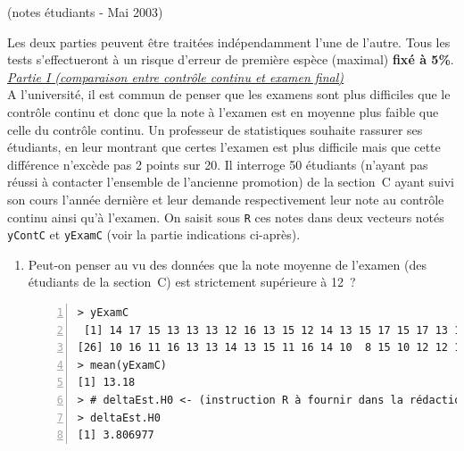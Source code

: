 \documentclass[10pt]{report}
\begin{document}
\begin{exercice} (notes étudiants - Mai 2003)

Les deux parties peuvent {\^e}tre trait{\'e}es ind{\'e}pendamment l'une de l'autre. Tous les tests s'effectueront {\`a} un risque d'erreur de premi{\`e}re esp{\`e}ce (maximal) \textbf{fix{\'e} {\`a} 5\%}.\\

\noindent \underline{\textit{Partie I (comparaison entre contr{\^o}le continu et examen final)}} \\

A l'universit{\'e}, il est commun de penser que les examens sont plus difficiles que le contr{\^o}le continu et donc que la note {\`a} l'examen est en moyenne plus faible que celle du contr{\^o}le continu. Un professeur de statistiques souhaite rassurer ses {\'e}tudiants, en leur montrant que certes l'examen est plus difficile mais que cette diff{\'e}rence n'exc{\`e}de pas 2 points sur 20. Il interroge 50 {\'e}tudiants (n'ayant pas r{\'e}ussi {\`a} contacter l'ensemble de l'ancienne promotion) de la section~C ayant suivi son cours l'ann{\'e}e derni{\`e}re et leur demande respectivement leur note au contr{\^o}le continu ainsi qu'{\`a} l'examen. On saisit sous \texttt{R} ces notes dans deux vecteurs not{\'e}s \texttt{yContC} et \texttt{yExamC} (voir la partie indications ci-apr{\`e}s). \\

\begin{enumerate}
\item Peut-on penser au vu des donn{\'e}es que la note moyenne de l'examen (des {\'e}tudiants de la section~C) est strictement sup{\'e}rieure {\`a} 12~?

\IndicR
\begin{Verbatim}[frame=leftline,fontfamily=tt,fontshape=n,numbers=left]
> yExamC
 [1] 14 17 15 13 13 13 12 16 13 15 12 14 13 15 17 15 17 13 13 12 15 14 12 13  9
[26] 10 16 11 16 13 13 14 13 15 11 16 14 10  8 15 10 12 12 12 15 10 15  9 13 11
> mean(yExamC)
[1] 13.18
> # deltaEst.H0 <- (instruction R à fournir dans la rédaction)
> deltaEst.H0
[1] 3.806977
\end{Verbatim}

 

\begin{Correction}


\end{Correction}
\end{enumerate}
\end{exercice}
\end{document}
